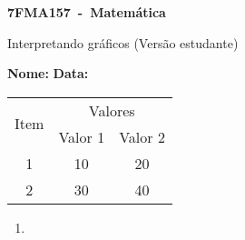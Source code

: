 \documentclass[a4paper,14pt]{article}
\begin{document}
	
	\noindent\textbf{7FMA157~-~Matemática} 
	
	\begin{center}Interpretando gráficos (Versão estudante)
	\end{center}
	
	
	\noindent\textbf{Nome:} \underline{\hspace{10cm}}
    \noindent\textbf{Data:} \underline{\hspace{4cm}}
	
	
	\begin{multicols}{2}
		
		\begin{tabular}{|c|c|c|}
			\hline
			\multirow{2}{*}{Item} & \multicolumn{2}{c|}{Valores} \\
			\cline{2-3}
			& Valor 1 & Valor 2 \\
			\hline
			1 & 10 & 20 \\
			\hline
			2 & 30 & 40 \\
			\hline
		\end{tabular}
		
		\begin{enumerate}
			\item 
		\end{enumerate}
    \end{multicols}
\end{document}
